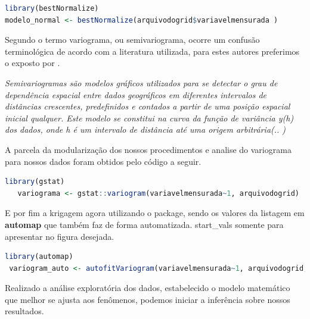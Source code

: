  \lstset{
	language=R, %
	caption= normalizacao do modelo em linguagem R,} %
\begin{lstlisting}[language=R]
 library(bestNormalize)
modelo_normal <- bestNormalize(arquivodogrid$variavelmensurada )
\end{lstlisting}  
\hspace*{1.25 cm}  Segundo \cite[P.35]{Yamamoto} o termo variograma, ou semivariograma, ocorre um confusão terminológica de acordo com a literatura utilizada, para estes autores preferimos o exposto por \cite[p.228]{Ferreira}.  \begin{quoting}[rightmargin=0cm,leftmargin=2cm]
	\begin{singlespace}
		{
	\textit{Semivariogramas são modelos gráficos utilizados para se detectar o grau de dependência espacial entre dados geográficos em diferentes intervalos de distâncias crescentes, predefinidos e contados a partir de uma posição espacial inicial qualquer. Este modelo se constitui na curva da função de variância y(h) dos dados, onde h é um intervalo de distância até uma origem arbitrária(.. )}
		}
	\end{singlespace}
\end{quoting}
%
\hspace*{1.25 cm} A  parcela da modularização dos nossos procedimentos e analise do variograma para nossos dados foram obtidos pelo código a seguir.  
 \lstset{
	language=R, %
	caption= Producao do variogramas em linguagem R,} %
\begin{lstlisting}[language=R]
	library(gstat)
   variograma <- gstat::variogram(variavelmensurada~1, arquivodogrid)
\end{lstlisting}  
\hspace*{1.25 cm}  E por fim a krigagem agora utilizando o package, sendo os valores da listagem em  \textbf{\textcolor{blue!55!black}{automap}} que também faz de forma automatizada. start\_vals somente para apresentar no figura desejada.
  \lstset{
 	language=R, %
 	caption= Produção da krigagem em linguagem R,} %
 \begin{lstlisting}[language=R]
   library(automap)
 variogram_auto <- autofitVariogram(variavelmensurada~1, arquivodogrid, start_vals=c(variogramar$nugget, variogramar$cov.pars[2], variograma$cov.pars[1]))
 \end{lstlisting}  
\hspace*{1.25 cm} Realizado a análise exploratória dos dados, estabelecido o modelo matemático que melhor se ajusta aos  fenômenos, podemos iniciar a inferência sobre nossos resultados. 
